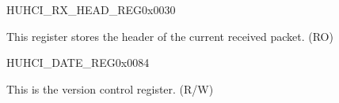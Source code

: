 \begin{register}{H}{UHCI\_RX\_HEAD\_REG}{0x{}0030}\label{regdesc:UHCIRXHEADREG}
%
\regnewline%
\begin{regdesc}\begin{reglist}
\label{fielddesc:UHCIRXHEAD}\item [UHCI\_RX\_HEAD] This register stores the header of the current received packet. (RO)
\end{reglist}\end{regdesc}
\end{register}


\begin{register}{H}{UHCI\_DATE\_REG}{0x{}0084}\label{regdesc:UHCIDATEREG}
%
\regnewline%
\begin{regdesc}\begin{reglist}
\label{fielddesc:UHCIDATE}\item [UHCI\_DATE] This is the version control register. (R/W)
\end{reglist}\end{regdesc}
\end{register}


